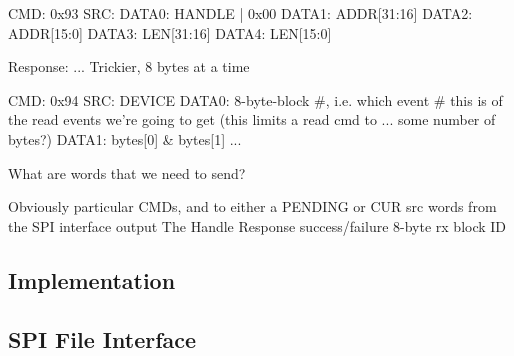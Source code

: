 CMD: 0x93
SRC: 
DATA0: HANDLE | 0x00
DATA1: ADDR[31:16]
DATA2: ADDR[15:0]
DATA3: LEN[31:16]
DATA4: LEN[15:0]

Response: ... Trickier, 8 bytes at a time

 
CMD: 0x94
SRC: DEVICE
DATA0: 8-byte-block #, i.e. which event # this is of the read events we're going to get (this limits a read cmd to ... some number of bytes?)
DATA1: bytes[0] & bytes[1]
...

What are words that we need to send? 

Obviously particular CMDs, and to either a PENDING or CUR src
words from the SPI interface output
The Handle
Response success/failure
8-byte rx block ID

\subsection{Implementation}

\subsection{SPI File Interface}
